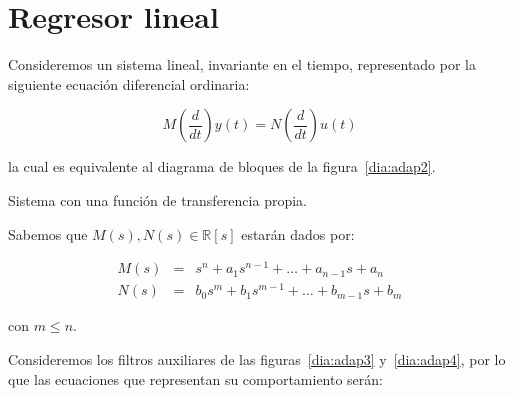     \section{Regresor lineal}

        Consideremos un sistema lineal, invariante en el tiempo, representado por la siguiente ecuación diferencial ordinaria:

        \begin{equation} \label{eq:adap1}
            M \left( \frac{d}{dt} \right) y(t) = N \left( \frac{d}{dt} \right) u(t)
        \end{equation}

        la cual es equivalente al diagrama de bloques de la figura~\ref{dia:adap2}.

        \begin{marginfigure}
            \centering
            \caption{\label{dia:adap2}Sistema con una función de transferencia propia.}
        \end{marginfigure}

        Sabemos que $M(s), N(s) \in \mathbb{R}[s]$ estarán dados por:

        \begin{eqnarray} \label{eq:adap2}
            M(s) & = & s^n + a_1 s^{n-1} + \dots + a_{n-1} s + a_n \nonumber \\
            N(s) & = & b_0 s^m + b_1 s^{m-1} + \dots + b_{m-1} s + b_m
        \end{eqnarray}

        con $m \le n$.

        Consideremos los filtros auxiliares de las figuras~\ref{dia:adap3} y~\ref{dia:adap4}, por lo que las ecuaciones que representan su comportamiento serán:

